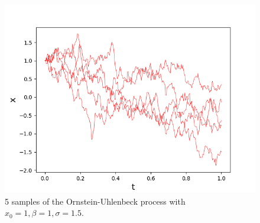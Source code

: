 \begin{figure}[H]
\centering
  \includegraphics[scale=0.4]{content/Graphics/Figure_SamplingOU.png}
  \caption{5 samples of the Ornstein-Uhlenbeck process with \(x_0 = 1 , \beta = 1, \sigma = 1.5\).}
  \label{fig:}
\end{figure}


























